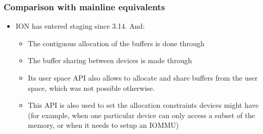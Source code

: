 \begin{frame}
  \frametitle{Comparison with mainline equivalents}
  \begin{itemize}
    \item ION has entered staging since 3.14. And:
    \begin{itemize}
    \item The contiguous allocation of the buffers is done through
    \item The buffer sharing between devices is made through
    \item Its user space API also allows to allocate and share buffers
      from the user space, which was not possible otherwise.
    \item This API is also used to set the allocation constraints
      devices might have (for example, when one particular device can
      only access a subset of the memory, or when it needs to setup an
      IOMMU)
    \end{itemize}
  \end{itemize}
\end{frame}
